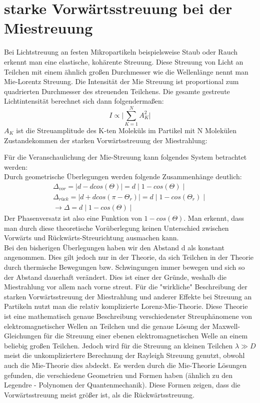 \section{starke Vorwärtsstreuung bei der Miestreuung}
Bei Lichtstreuung an festen Mikropartikeln beispielsweise Staub oder Rauch erkennt man eine elastische, kohärente Streuung. Diese Streuung von Licht an Teilchen mit einem ähnlich großen Durchmesser wie die Wellenlänge nennt man Mie-Lorentz Streuung. Die Intensität der Mie Streuung ist proportional zum quadrierten Durchmesser des streuenden Teilchens. Die gesamte gestreute Lichtintensität berechnet sich dann folgendermaßen:
\begin{equation}
I\propto \biggl| \sum_{K=1}^N A^2_K \biggl|
\end{equation}
$A_K$ ist die Streuamplitude des K-ten Moleküls im Partikel mit N Molekülen
Zustandekommen der starken Vorwärtsstreuung der Miestrahlung: 

Für die Veranschaulichung der Mie-Streuung kann folgendes System betrachtet werden:\\
Durch geometrische Überlegungen werden folgende Zusammenhänge deutlich:
\begin{align*}
\Delta_{vor}=\mid d-dcos(\Theta)\mid=d\mid 1-cos(\Theta) \mid\\
\Delta_{rück}=\mid d+dcos(\pi-\Theta_r)\mid=d\mid 1-cos(\Theta_r) \mid\\
\rightarrow \Delta = d\mid 1-cos(\Theta) \mid
\end{align*}
Der Phasenversatz ist also eine Funktion von $1-cos(\Theta)$.
Man erkennt, dass man durch diese theoretische Vorüberlegung keinen Unterschied zwischen Vorwärts und Rückwärts-Streurichtung ausmachen kann. \\
Bei den bisherigen Überlegungen haben wir den Abstand d als konstant angenommen. Dies gilt jedoch nur in der Theorie, da sich Teilchen in der Theorie durch thermische Bewegungen bzw. Schwingungen immer bewegen und sich so der Abstand dauerhaft verändert. Dies ist einer der Gründe, weshalb die Miestrahlung vor allem nach vorne streut. 
Für die "wirkliche" Beschreibung der starken Vorwärtsstreuung der Miestrahlung und anderer Effekte bei Streuung an Partikeln nutzt man die relativ komplizierte Lorenz-Mie-Theorie. Diese Theorie ist eine mathematisch genaue Beschreibung verschiedenster Streuphänomene von elektromagnetischer Wellen an Teilchen und die genaue Lösung der Maxwell-Gleichungen für die Streuung einer ebenen elektromagnetischen Welle an einem beliebig großen Teilchen. Jedoch wird für die Streuung an kleinen Teilchen $\lambda\gg D$ meist die unkompliziertere Berechnung der Rayleigh Streuung genutzt, obwohl auch die Mie-Theorie dies abdeckt. Es werden durch die Mie-Theorie Lösungen gefunden, die verschiedene Geometrien und Formen haben (ähnlich zu den Legendre - Polynomen der Quantenmechanik). Diese Formen zeigen, dass die Vorwärtsstreuung meist größer ist, als die Rückwärtsstreuung.

